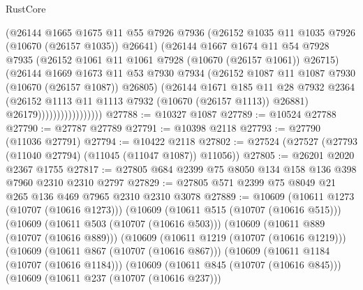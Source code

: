 \begin{lexlean}{RustCore}
\begin{coremodule}
                              (@26144
                                @1665
                                @1675
                                @11
                                @55
                                @7926
                                @7936
                                (@26152 @1035 @11 @1035 @7926 (@10670 (@26157 @1035)) @26641)
                                (@26144
                                  @1667
                                  @1674
                                  @11
                                  @54
                                  @7928
                                  @7935
                                  (@26152 @1061 @11 @1061 @7928 (@10670 (@26157 @1061)) @26715)
                                  (@26144
                                    @1669
                                    @1673
                                    @11
                                    @53
                                    @7930
                                    @7934
                                    (@26152 @1087 @11 @1087 @7930 (@10670 (@26157 @1087)) @26805)
                                    (@26144
                                      @1671
                                      @185
                                      @11
                                      @28
                                      @7932
                                      @2364
                                      (@26152 @1113 @11 @1113 @7932 (@10670 (@26157 @1113)) @26881)
                                      @26179)))))))))))))))))
@27788 := @10327 @1087
@27789 := @10524 @27788
@27790 := @27787 @27789
@27791 := @10398 @2118
@27793 := @27790 (@11036 @27791)
@27794 := @10422 @2118
@27802 := @27524 (@27527 (@27793 (@11040 @27794) (@11045 (@11047 @1087)) @11056))
@27805 := @26201 @2020 @2367 @1755
@27817 := @27805 @684 @2399 @75 @8050 @134 @158 @136 @398 @7960 @2310 @2310 @2797
@27829 := @27805 @571 @2399 @75 @8049 @21 @265 @136 @469 @7965 @2310 @2310 @3078
@27889 := @10609
    (@10611 @1273 (@10707 (@10616 @1273)))
    (@10609
      (@10611 @515 (@10707 (@10616 @515)))
      (@10609
        (@10611 @503 (@10707 (@10616 @503)))
        (@10609
          (@10611 @889 (@10707 (@10616 @889)))
          (@10609
            (@10611 @1219 (@10707 (@10616 @1219)))
            (@10609
              (@10611 @867 (@10707 (@10616 @867)))
              (@10609
                (@10611 @1184 (@10707 (@10616 @1184)))
                (@10609
                  (@10611 @845 (@10707 (@10616 @845)))
                  (@10609
                    (@10611 @237 (@10707 (@10616 @237)))

\end{coremodule}
\end{lexlean}
